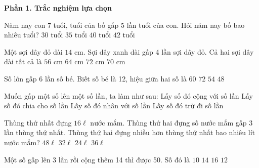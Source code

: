\textbf{Phần 1. Trắc nghiệm lựa chọn}

\begin{ex} %
Năm nay con 7 tuổi, tuổi của bố gấp 5 lần tuổi của con. Hỏi năm nay bố bao nhiêu tuổi?
\choice
{$30$ tuổi}
{\True $35$ tuổi}
{$40$ tuổi}
{$42$ tuổi}
\end{ex}

\begin{ex} %
Một sợi dây đỏ dài $14\text{ cm}$. Sợi dây xanh dài gấp 4 lần sợi dây đỏ. Cả hai sợi dây dài tất cả là
\choice
{$56\text{ cm}$}
{$64\text{ cm}$}
{$72\text{ cm}$}
{\True $70\text{ cm}$}
\end{ex}

\begin{ex} %
Số lớn gấp 6 lần số bé. Biết số bé là 12, hiệu giữa hai số là
\choice
{\True $60$}
{$72$}
{$54$}
{$48$}
\end{ex}

\begin{ex} %
Muốn gấp một số lên một số lần, ta làm như sau:
\choice
{Lấy số đó cộng với số lần}
{Lấy số đó chia cho số lần}
{\True Lấy số đó nhân với số lần}
{Lấy số đó trừ đi số lần}
\end{ex}

\begin{ex} %
Thùng thứ nhất đựng $16\ell$ nước mắm. Thùng thứ hai đựng số nước mắm gấp 3 lần thùng thứ nhất. Thùng thứ hai đựng nhiều hơn thùng thứ nhất bao nhiêu lít nước mắm?
\choice
{$48\ell$}
{\True $32\ell$}
{$24\ell$}
{$36\ell$}
\end{ex}

\begin{ex} %
Một số gấp lên 3 lần rồi cộng thêm 14 thì được 50. Số đó là
\choice
{$10$}
{$14$}
{$16$}
{\True $12$}
\end{ex}

